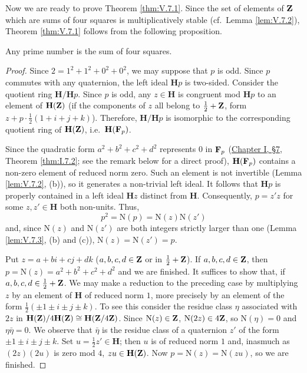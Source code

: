 Now we are ready to prove Theorem \ref{thm:V.7.1}. Since the set of elements
of $\mathbf{Z}$ which are sums of four squares is multiplicatively stable (cf.\
Lemma \ref{lem:V.7.2}), Theorem \ref{thm:V.7.1} follows from the following
proposition.

\begin{proposition}
\label{prop:V.7.1}
Any prime number is the sum of four squares.
\end{proposition}

\begin{proof}
Since $2=1^{2}+1^{2}+0^{2}+0^{2}$, we may suppose that $p$ is odd. Since $p$
commutes with any quaternion, the left ideal $\mathbf{H}p$ is two-sided.
Consider the quotient ring $\mathbf{H}/\mathbf{H}p$. Since $p$ is odd, any
$z\in\mathbf{H}$ is congruent mod $\mathbf{H}p$ to an element of
$\mathbf{H}(\mathbf{Z})$ (if the components of $z$ all belong to
$\frac{1}{2}+\mathbf{Z}$, form $z+p\cdot\frac{1}{2}(1+i+j+k)$). Therefore,
$\mathbf{H}/\mathbf{H}p$ is isomorphic to the corresponding quotient ring of
$\mathbf{H}(\mathbf{Z})$, i.e.\ $\mathbf{H}(\mathbf{F}_{p})$.

Since the quadratic form $a^{2}+b^{2}+c^{2}+d^{2}$ represents $0$ in
$\mathbf{F}_{p}$ (\hyperref[sec:1.7]{Chapter I, §7}, Theorem \ref{thm:I.7.2}; see the remark below for a
direct proof), $\mathbf{H}(\mathbf{F}_{p})$ contains a non-zero element of reduced
norm zero. Such an element is not invertible (Lemma \ref{lem:V.7.2}, (b)),
so it generates a non-trivial left ideal. It follows that $\mathbf{H}p$ is
properly contained in a left ideal $\mathbf{H}z$ distinct from
$\mathbf{H}$. Consequently, $p=z'z$ for some $z,z'\in\mathbf{H}$ both
non-units. Thus,
\[
p^{2}=\mathrm{N}(p)=\mathrm{N}(z)\mathrm{N}(z')
\]
and, since $\mathrm{N}(z)$ and $\mathrm{N}(z')$ are both integers strictly
larger than one (Lemma \ref{lem:V.7.3}, (b) and (c)),
$\mathrm{N}(z)=\mathrm{N}(z')=p$.

Put $z=a+bi+cj+dk$ ($a,b,c,d\in\mathbf{Z}$ or in $\frac{1}{2}+\mathbf{Z}$). If
$a,b,c,d\in\mathbf{Z}$, then $p=\mathrm{N}(z)=a^{2}+b^{2}+c^{2}+d^{2}$ and we are
finished. It suffices to show that, if $a,b,c,d\in\frac{1}{2}+\mathbf{Z}$. We may
make a reduction to the preceding case by multiplying $z$ by an element of
$\mathbf{H}$ of reduced norm $1$, more precisely by an element of the form
$\frac{1}{2}(\pm1\pm i\pm j\pm k)$. To see this consider the residue class
$\eta$ associated with $2z$ in
$\mathbf{H}(\mathbf{Z})/4\mathbf{H}(\mathbf{Z})\cong\mathbf{H}(\mathbf{Z}/4\mathbf{Z})$. Since
$\mathrm{N}(z)\in\mathbf{Z}$, $\mathrm{N}(2z)\in4\mathbf{Z}$, so $\mathrm{N}(\eta)=0$ and
$\eta\bar\eta=0$. We observe that $\bar\eta$ is the residue class of a
quaternion $z'$ of the form $\pm1\pm i\pm j\pm k$. Set
$u=\frac{1}{2}z'\in\mathbf{H}$; then $u$ is of reduced norm $1$ and,
inasmuch as $(2z)(2u)$ is zero mod $4$, $zu\in\mathbf{H}(\mathbf{Z})$. Now
$p=\mathrm{N}(z)=\mathrm{N}(zu)$, so we are finished.
\end{proof}

